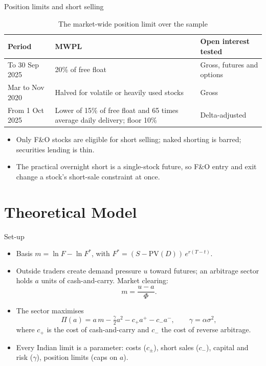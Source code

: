 \documentclass[11pt]{beamer}
\begin{document}
\begin{frame}{Position limits and short selling}
  \begin{table}
    \scriptsize
    \caption{The market-wide position limit over the sample}
    \begin{tabular}{@{}p{2.4cm}p{4.6cm}p{3.2cm}@{}}
      \toprule
      Period & MWPL & Open interest tested \\
      \midrule
      To 30 Sep 2025 & 20\% of free float & Gross, futures and options \\
      Mar to Nov 2020 & Halved for volatile or heavily used stocks & Gross \\
      From 1 Oct 2025 & Lower of 15\% of free float and 65 times average daily delivery; floor 10\% & Delta-adjusted \\
      \bottomrule
    \end{tabular}
  \end{table}
  \begin{itemize}
    \small
    \item Only F\&O stocks are eligible for short selling; naked shorting is barred; securities lending is thin.
    \item The practical overnight short is a single-stock future, so F\&O entry and exit change a stock's short-sale
    constraint at once.
  \end{itemize}
\end{frame}

\section{Theoretical Model}

\begin{frame}{Set-up}
  \begin{itemize}
    \item Basis $m=\ln F-\ln F^*$, with $F^*=(S-\mathrm{PV}(D))\,e^{r(T-t)}$.
    \item Outside traders create demand pressure $u$ toward futures; an arbitrage sector holds $a$ units of
    cash-and-carry. Market clearing:
    \[ m=\frac{u-a}{\Phi}. \]
    \item The sector maximises
    \[ \Pi(a)=a\,m-\tfrac{\gamma}{2}a^2-c_+a^+-c_-a^-,\qquad \gamma=\alpha\sigma^2, \]
    where $c_+$ is the cost of cash-and-carry and $c_-$ the cost of reverse arbitrage.
    \item Every Indian limit is a parameter: costs ($c_\pm$), short sales ($c_-$), capital and risk ($\gamma$),
    position limits (caps on $a$).
  \end{itemize}
\end{frame}
\end{document}
